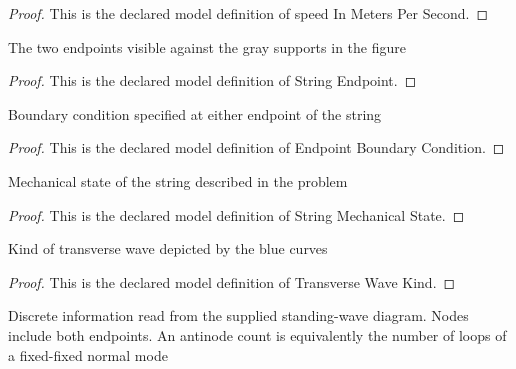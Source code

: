 \begin{proof}
  This is the declared model definition of speed In Meters Per Second.
\end{proof}
\begin{definition}
  \label{def:physics:phyx-mini-0177:phyxminiproblems-problemphyxmini0177-stringendpoint}
  The two endpoints visible against the gray supports in the figure
\end{definition}
\begin{proof}
  This is the declared model definition of String Endpoint.
\end{proof}
\begin{definition}
  \label{def:physics:phyx-mini-0177:phyxminiproblems-problemphyxmini0177-endpointboundarycondition}
  Boundary condition specified at either endpoint of the string
\end{definition}
\begin{proof}
  This is the declared model definition of Endpoint Boundary Condition.
\end{proof}
\begin{definition}
  \label{def:physics:phyx-mini-0177:phyxminiproblems-problemphyxmini0177-stringmechanicalstate}
  Mechanical state of the string described in the problem
\end{definition}
\begin{proof}
  This is the declared model definition of String Mechanical State.
\end{proof}
\begin{definition}
  \label{def:physics:phyx-mini-0177:phyxminiproblems-problemphyxmini0177-transversewavekind}
  Kind of transverse wave depicted by the blue curves
\end{definition}
\begin{proof}
  This is the declared model definition of Transverse Wave Kind.
\end{proof}
\begin{definition}
  \label{def:physics:phyx-mini-0177:phyxminiproblems-problemphyxmini0177-standingwavefigure}
  Discrete information read from the supplied standing-wave diagram. Nodes include both endpoints. An antinode count is equivalently the number of loops of a fixed-fixed normal mode
\end{definition}
